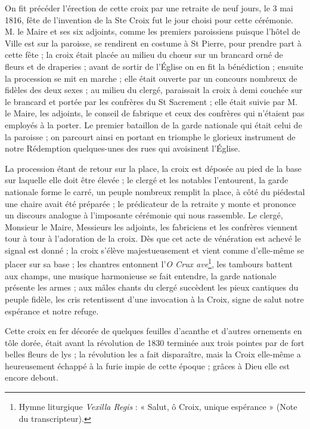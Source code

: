 \documentclass[11pt,a4paper]{report}
\begin{document}
On fit précéder l'érection de cette croix par une retraite de neuf jours, le 3 mai 1816, fête de l'invention de la Ste Croix fut le jour choisi pour cette cérémonie. M. le Maire et ses six adjoints, comme les premiers paroissiens puisque l'hôtel de Ville est sur la paroisse, se rendirent en costume à St Pierre, pour prendre part à cette fête ; la croix était placée au milieu du chœur sur un brancard orné de fleurs et de draperies ; avant de sortir de l'Église on en fit la bénédiction ; ensuite la procession se mit en marche ; elle était ouverte par un concours nombreux de fidèles des deux sexes ; au milieu du clergé, paraissait la croix à demi couchée sur le brancard et portée par les confrères du St Sacrement ; elle était suivie par M. le Maire, les adjoints, le conseil de fabrique et ceux des confrères qui n'étaient pas employés à la porter. Le premier bataillon de la garde nationale qui était celui de la paroisse ; on parcourt ainsi en portant en triomphe le glorieux instrument de notre Rédemption quelques-unes des rues qui avoisinent l'Église.

La procession étant de retour sur la place, la croix est déposée au pied de la base sur laquelle elle doit être élevée ; le clergé et les notables l'entourent, la garde nationale forme le carré, un peuple nombreux remplit la place, à côté du piédestal une chaire avait été préparée ; le prédicateur de la retraite y monte et prononce un discours analogue à l'imposante cérémonie qui nous rassemble. Le clergé, Monsieur le Maire, Messieurs les adjoints, les fabriciens et les confrères viennent tour à tour à l'adoration de la croix. Dès que cet acte de vénération est achevé le signal est donné ; la croix s'élève majestueusement et vient comme d'elle-même se placer sur sa base ; les chantres entonnent l'\textit{O Crux ave}\footnote{Hymne liturgique \textit{Vexilla Regis} : « Salut, ô Croix, unique espérance » (Note du transcripteur).}, les tambours battent aux champs, une musique harmonieuse se fait entendre, la garde nationale présente les armes ; aux mâles chants du clergé succèdent les pieux cantiques du peuple fidèle, les cris retentissent d'une invocation à la Croix, signe de salut notre espérance et notre refuge.

Cette croix en fer décorée de quelques feuilles d'acanthe et d'autres ornements en tôle dorée, était avant la révolution de 1830 terminée aux trois pointes par de fort belles fleurs de lys ; la révolution les a fait disparaître, mais la Croix elle-même a heureusement échappé à la furie impie de cette époque ; grâces à Dieu elle est encore debout.
\end{document}
